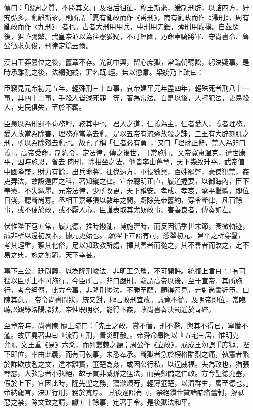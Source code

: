 \begin{pinyinscope}
 傳曰：「殷周之質，不勝其文。」及昭后徂征，穆王斯耄，爰制刑辟，以詰四方，奸宄弘多，亂離斯永，則所謂「夏有亂政而作《禹刑》，商有亂政而作《湯刑》，周有亂政而作《九刑》」者也。古者大刑用甲兵，中刑用刀鋸，薄刑用鞭撲。自茲厥後，狙詐彌繁。武皇帝並以為往憲猶疑，不可經國，乃命車騎將軍、守尚書令、魯公徵求英俊，刊律定篇云爾。



 漢自王莽篡位之後，舊章不存。光武中興，留心庶獄，常臨朝聽訟，躬決疑事。是時承離亂之後，法網弛縱，罪名既
 輕，無以懲肅。梁統乃上疏曰：



 臣竊見元帝初元五年，輕殊刑三十四事，哀帝建平元年盡四年，輕殊死者刑八十一事，其四十二事，手殺人皆減死罪一等，著為常法。自是以後，人輕犯法，吏易殺人，吏民俱失，至於不羈。



 臣愚以為刑罰不茍務輕，務其中也。君人之道，仁義為主，仁者愛人，義者理務。愛人故當為除害，理務亦當為去亂。是以五帝有流殛放殺之誅，三王有大辟刻肌之刑，所以為除殘去亂也。故孔子稱「仁者必有勇」，又曰「理財正辭，禁人為非曰義」。高帝受命，制約令，定法律，傳之後世，可常施行。文帝寬惠溫克，遭世康平，因時施恩，省去
 肉刑，除相坐之法，他皆率由舊章，天下幾致升平。武帝值中國隆盛，財力有餘，出兵命將，征伐遠方，軍役數興，百姓罷弊，豪傑犯禁，姦吏弄法，故設遁匿之科，著知縱之律。宣帝聰明正直，履道握要，以御海內，臣下奉憲，不失繩墨。元帝法律，少所改更，天下稱安。孝成、孝哀，承平繼體，即位日淺，聽斷尚寡。丞相王嘉等猥以數年之間，虧除先帝舊約，穿令斷律，凡百餘事，或不便於政，或不厭人心。臣謹表取其尤妨政事、害善良者，傅奏如左。



 伏惟陛下苞五常，履九德，推時撥亂，博施濟時，而反因循季世末節，衰微軌迹，誠非所以還初反本，據元更始也。
 願陛下宣詔有司，悉舉初元、建平之所穿鑿，考其輕重，察其化俗，足以知政教所處，擇其善者而從之，其不善者而改之，定不易之典，施之無窮，天下幸甚。



 事下三公、廷尉議，以為隆刑峻法，非明王急務，不可開許。統復上言曰：「有司猥以臣所上不可施行。今臣所言，非曰嚴刑。竊謂高帝以後，至于宣帝，其所施行，考合經傳，此方今事，非隆刑峻法。不勝至願，願得召見，若對尚書近臣，口陳其意。」帝令尚書問狀，統又對，極言政刑宜改。議竟不從。及明帝即位，常臨聽訟觀錄洛陽諸獄。帝性既明察，能得下姦，故尚書奏決罰近於苛碎。



 至章帝時，尚書陳
 寵上疏曰：「先王之政，賞不僭，刑不濫，與其不得已，寧僭不濫。故唐堯著典曰『流宥五刑，眚災肆赦』。帝舜命皋陶以『五宅三居，惟明克允』。文王重《易》六爻，而列叢棘之聽；周公作《立政》，戒成王勿誤乎庶獄。陛下即位，率由此義，而有司執事，未悉奉承。斷獄者急於榜格酷烈之痛，執憲者繁於詐欺放濫之文，違本離實，箠楚為姦，或因公行私，以逞威福。夫為政也，猶張琴瑟，大弦急者小弦絕，故子貢非臧孫之猛法，而美鄭僑之仁政。方今聖德充塞，假於上下，宜因此時，隆先聖之務，蕩滌煩苛，輕薄箠楚，以濟群生，廣至德也。」帝納寵言，決罪行刑，務於寬厚。
 其後遂詔有司，禁絕鑽金贊諸酷痛舊制，解祅惡之禁，除文致之請，讞五十餘事，定著于令。是後獄法和平。




\end{pinyinscope}
